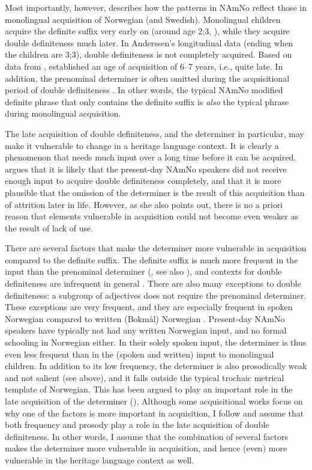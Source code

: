 \documentclass[output=paper]{langscibook}
\begin{document}
Most importantly, however, \citet{vanBaal2020} describes how the patterns in NAmNo reflect those in monolingual acquisition of Norwegian (and Swedish). Monolingual children acquire the definite suffix very early on (around age 2;3, \citealt{Anderssen2006,Anderssen2012}), while they acquire double definiteness much later. In Anderssen's longitudinal data (ending when the children are 3;3), double definiteness is not completely acquired. Based on data from \citet{BusterudEtAl2019}, \citet[163--164]{vanBaal2020} established an age of acquisition of 6--7 years, i.e., quite late. In addition, the prenominal determiner is often omitted during the acquisitional period of double definiteness \citep{Anderssen2006, Anderssen2012}. In other words, the typical NAmNo modified definite phrase that only contains the definite suffix is \textit{also} the typical phrase during monolingual acquisition.
 
The late acquisition of double definiteness, and the determiner in particular, may make it vulnerable to change in a heritage language context. It is clearly a phenomenon that needs much input over a long time before it can be acquired.  argues that it is likely that the present-day NAmNo speakers did not receive enough input to acquire double definiteness completely, and that it is more plausible that the omission of the determiner is the result of this acquisition than of attrition later in life. However, as she also points out, there is no a priori reason that elements vulnerable in acquisition could not become even weaker as the result of lack of use.

There are several factors that make the determiner more vulnerable in acquisition compared to the definite suffix. The definite suffix is much more frequent in the input than the prenominal determiner (\citealt[751]{ALW2018}, see also \citealt[168--169]{vanBaal2020}), and contexts for double definiteness are infrequent in general \citep[121]{Dahl2015}. There are also many exceptions to double definiteness: a subgroup of adjectives does not require the prenominal determiner. These exceptions are very frequent, and they are especially frequent in spoken Norwegian compared to written (Bokmål) Norwegian \citep{vanBaal2020,vanBaal2024}. Present-day NAmNo speakers have typically not had any written Norwegian input, and no formal schooling in Norwegian either. In their solely spoken input, the determiner is thus even less frequent than in the (spoken and written) input to monolingual children. In addition to its low frequency, the determiner is also prosodically weak and not salient (see  above), and it falls outside the typical trochaic metrical template of Norwegian. This has been argued to play an important role in the late acquisition of the determiner (\citealt{Anderssen2006, Bohnacker2003, KupischEtAl2009}). Although some acquisitional works focus on why one of the factors is more important in acquisition, I follow \citet[236]{Bohnacker2003} and assume that both frequency and prosody play a role in the late acquisition of double definiteness. In other words, I assume that the combination of several factors makes the determiner more vulnerable in acquisition, and hence (even) more vulnerable in the heritage language context as well.
 
\end{document}
